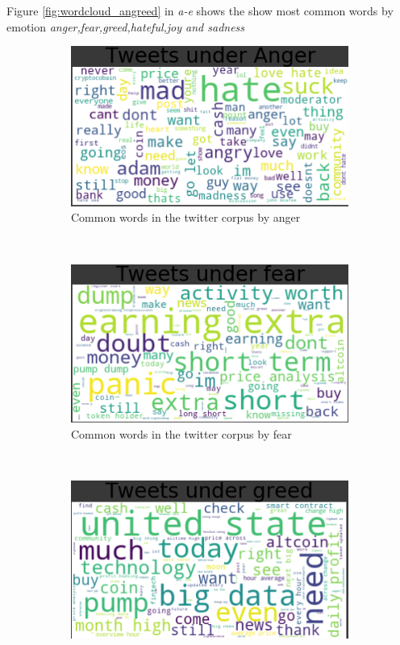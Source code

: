 \documentclass[a4paper, 12pt]{article}
\begin{document}
Figure \ref{fig:wordcloud_angreed} in \textit{a-e} shows the show most common words by emotion \textit{anger,fear,greed,hateful,joy and sadness}
\begin{figure}[H]
    \centering
    \begin{subfigure}[a]{0.3\textwidth}
        \includegraphics[width=\textwidth]{res/wordcloud_anger.png}
        \caption{Common words in the twitter corpus by anger}
    \end{subfigure}
    ~ %
    \begin{subfigure}[b]{0.3\textwidth}
        \includegraphics[width=\textwidth]{res/wordcloud_fear.png}
        \caption{Common words in the twitter corpus by fear}
    \end{subfigure}
		~ %
    \begin{subfigure}[c]{0.3\textwidth}
        \includegraphics[width=\textwidth]{res/wordcloud_greed.png}

\end{subfigure}
\end{figure}
\end{document}
